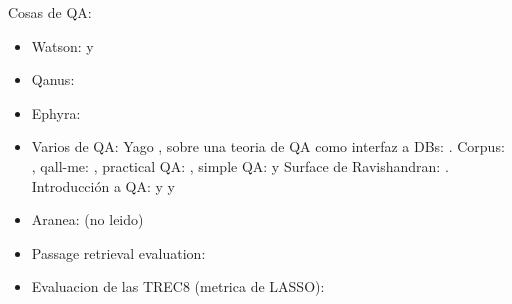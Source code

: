 Cosas de QA:
\begin{itemize}
\item Watson: \cite{WATSON1} y \cite{WATSON2}
\item Qanus: \cite{QANUS1}
\item Ephyra: \cite{EPHYRA1}
\item Varios de QA: Yago \cite{YAGO-QA1}, sobre una teoria de QA como interfaz a DBs: \cite{QADB1}. Corpus: \cite{TRAIN-QA1}, qall-me: \cite{QALL-ME1}, practical QA: \cite{QAS1}, simple QA: \cite{QAS2} y Surface de Ravishandran: \cite{SURF1}. Introducción a QA: \cite{QA1} y \cite{QA2} y \cite{QA3}
\item Aranea: \cite{ARANEA1} (no leido)
\item Passage retrieval evaluation: \cite{PASSAGE1}
\item Evaluacion de las TREC8 (metrica de \cite{QA3} LASSO): \cite{TREC8}
\end{itemize}

